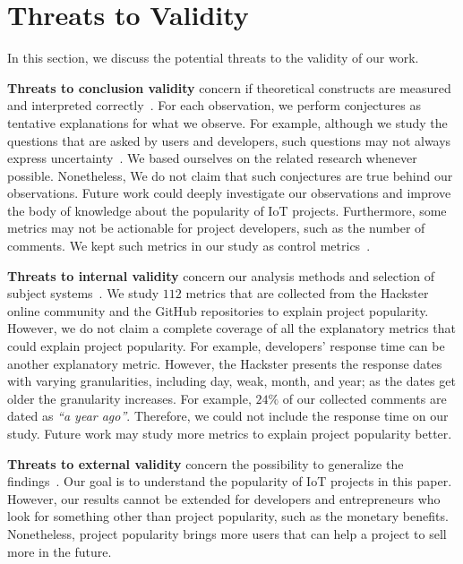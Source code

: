 \section{Threats to Validity}\label{section:threats}
\begin{comment}
\end{comment}

In this section, we discuss the potential threats to the validity of our work.

\textbf{Threats to conclusion validity} concern if theoretical constructs are
measured and interpreted correctly~\cite{Shull:2007:GAE:1324786}.  For each
observation, we perform conjectures as tentative explanations for what we
observe. For example, although we study the questions that are asked by users
and developers, such questions may not always express
uncertainty~\cite{ebert2017confusion}. We based ourselves on the related
research whenever possible.  Nonetheless, We do not claim that such conjectures
are true behind our observations. Future work could deeply investigate our
observations and improve the body of knowledge about the popularity of IoT
projects. Furthermore, some metrics may not be actionable for project
developers, such as the number of comments. We kept such metrics in our study
as control metrics~\cite{noru2012ibm}.


\textbf{Threats to internal validity} concern our analysis methods and
selection of subject systems~\cite{Shull:2007:GAE:1324786}.  We study $112$
metrics that are collected from the Hackster online community and the GitHub
repositories to explain project popularity. However, we do not claim a complete
coverage of all the explanatory metrics that could explain project popularity.
For example, developers' response time can be another explanatory metric.
However, the Hackster presents the response dates with varying granularities,
including day, weak, month, and year; as the dates get older the granularity
increases. For example, $24\%$ of our collected comments are dated as
\textit{``a year ago''}. Therefore, we could not include the response time on
our study.  Future work may study more metrics to explain project popularity
better. 

\textbf{Threats to external validity} concern the possibility to generalize the
findings~\cite{Shull:2007:GAE:1324786}. Our goal is to understand the
popularity of IoT projects in this paper. However, our results cannot be
extended for developers and entrepreneurs who look for something other than
project popularity, such as the monetary benefits. Nonetheless, project
popularity brings more users that can help a project to sell more in the
future.

